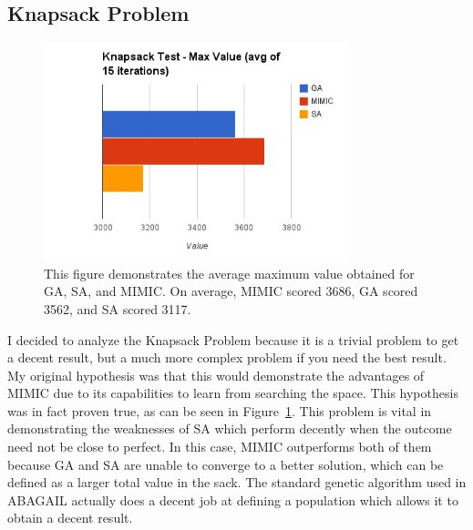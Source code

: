 \documentclass[annual]{acmsiggraph}
\begin{document}
\subsection{Knapsack Problem}
\begin{figure}[ht]
  \centering
  \includegraphics[width=3.5in]{charts/g8_knapsack.png}
  \caption{This figure demonstrates the average maximum value obtained for GA, SA, and MIMIC. On average, MIMIC scored 3686, GA 
  scored 3562, and SA scored 3117. }
  \label{fig:g8}
\end{figure}
I decided to analyze the Knapsack Problem because it is a trivial problem to get a decent result, but a much more complex problem if
you need the best result. My original hypothesis was that this would demonstrate the advantages of MIMIC due to its capabilities to
learn from searching the space. This hypothesis was in fact proven true, as can be seen in Figure~\ref{fig:g8}. This problem is vital
in demonstrating the weaknesses of SA which perform decently when the outcome need not be close to perfect. In this case, MIMIC
outperforms both of them because GA and SA are unable to converge to a better solution, which can be defined as a larger total value
in the sack.  The standard genetic algorithm used in ABAGAIL actually does a decent job at defining a population which allows it to
obtain a decent result. 
\end{document}
